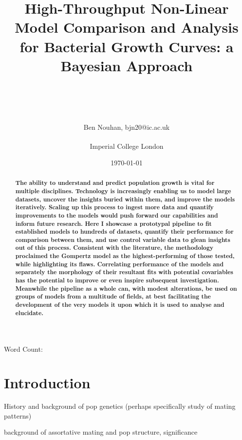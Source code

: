 \documentclass[11pt]{article}
\title{High-Throughput Non-Linear Model Comparison and Analysis for Bacterial Growth Curves: a Bayesian Approach}
\author{\\ \\ \\ \\ Ben Nouhan, bjn20@ic.ac.uk \\ \\ Imperial College London \\}
\date{\today}
\newcommand\wordcount{}
\begin{document}
\vspace{30mm}
\maketitle
\thispagestyle{empty}

\vspace{5mm}
\centerline{Word Count: \wordcount}

\vspace{15mm}
\onehalfspacing
\renewcommand{\abstractname}{\vspace{-\baselineskip}} %

\begin{abstract}
    \linenumbers
    \noindent
    \textbf{The ability to understand and predict population growth is vital for multiple disciplines. Technology is increasingly enabling us to model large datasets, uncover the insights buried within them, and improve the models iteratively. Scaling up this process to ingest more data and quantify improvements to the models would push forward our capabilities and inform future research. Here I showcase a prototypal pipeline to fit established models to hundreds of datasets, quantify their performance for comparison between them, and use control variable data to glean insights out of this process. Consistent with the literature, the methodology proclaimed the Gompertz model as the highest-performing of those tested, while highlighting its flaws. Correlating performance of the models and separately the morphology of their resultant fits with potential covariables has the potential to improve or even inspire subsequent investigation. Meanwhile the pipeline as a whole can, with modest alterations, be used on groups of models from a multitude of fields, at best facilitating the development of the very models it upon which it is used to analyse and elucidate.
    }
\end{abstract}
\vspace{10mm}


\newpage
\tableofcontents
\thispagestyle{empty}

\newpage
\linenumbers
\setcounter{page}{1}
\section{Introduction}%

History and background of pop genetics (perhaps specifically study of mating patterns)

background of assortative mating and pop structure, significance
\end{document}
